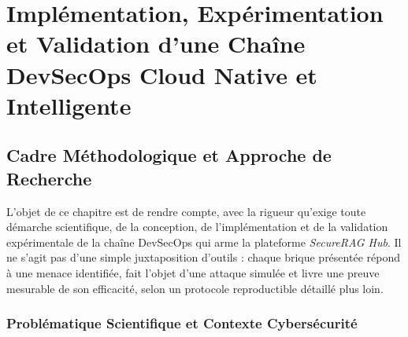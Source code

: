 
\providecommand{\definecolor}[3]{}
\definecolor{ForestGreen}{rgb}{0.13, 0.54, 0.13}
\definecolor{NavyBlue}{rgb}{0.0, 0.0, 0.5}
\definecolor{Goldenrod}{rgb}{0.85, 0.65, 0.13}
\definecolor{clrBlue}{rgb}{0.1, 0.3, 0.6}
\definecolor{LightGray}{rgb}{0.95, 0.95, 0.95}

\makeatletter
{}
\makeatother

\chapter{Implémentation, Expérimentation et Validation d'une Chaîne DevSecOps Cloud Native et Intelligente}
\label{ch:sprint_devsecops}

\section{Cadre Méthodologique et Approche de Recherche}
\label{sec:cadre_methodologique}

L'objet de ce chapitre est de rendre compte, avec la rigueur qu'exige toute démarche scientifique, de la conception, de l'implémentation et de la validation expérimentale de la chaîne DevSecOps qui arme la plateforme \textit{SecureRAG Hub}. Il ne s'agit pas d'une simple juxtaposition d'outils : chaque brique présentée répond à une menace identifiée, fait l'objet d'une attaque simulée et livre une preuve mesurable de son efficacité, selon un protocole reproductible détaillé plus loin.

\subsection{Problématique Scientifique et Contexte Cybersécurité}

